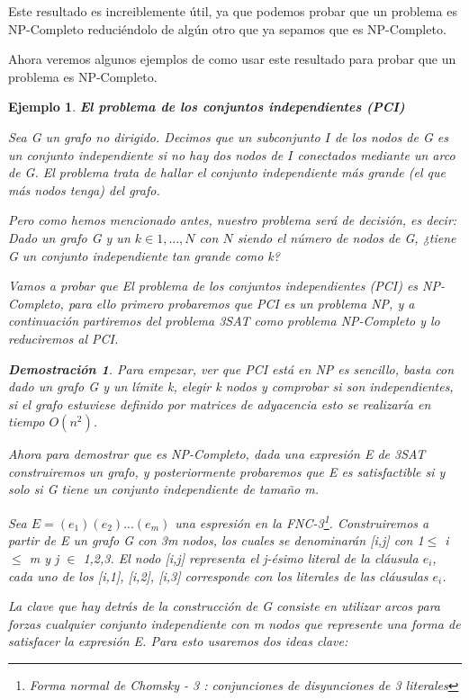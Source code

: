 \documentclass[a4paper,12pt,titlepage]{article}
\newtheorem{eje}{Ejemplo}[section]
\newtheorem*{dem}{\textbf{Demostraci\'on}}
\begin{document}
Este resultado es increiblemente \'util, ya que podemos probar que un problema es NP-Completo reduci\'endolo de alg\'un otro que ya sepamos que es NP-Completo.

Ahora veremos algunos ejemplos de como usar este resultado para probar que un problema es NP-Completo.

\begin{eje}

\textbf{El problema de los conjuntos independientes (PCI)}
\vspace{\baselineskip}

Sea G un grafo no dirigido. Decimos que un subconjunto $I$ de los nodos de G es un conjunto independiente si no hay dos nodos de $I$ conectados mediante un arco de G. El problema trata de hallar el conjunto independiente m\'as grande (el que m\'as nodos tenga) del grafo.

Pero como hemos mencionado antes, nuestro problema ser\'a de decisi\'on, es decir: Dado un grafo G y un $k \in {1,...,N}$ con $N$ siendo el n\'umero de nodos de G, ¿tiene G un conjunto independiente tan grande como k?

Vamos a probar que El problema de los conjuntos independientes (PCI) es NP-Completo, para ello primero probaremos que PCI \cite{HopcroftESP} es un problema NP, y a continuaci\'on partiremos del problema 3SAT como problema NP-Completo y lo reduciremos al PCI.

\begin{dem}

Para empezar, ver que PCI est\'a en NP es sencillo, basta con dado un grafo G y un l\'imite k, elegir k nodos y comprobar si son independientes, si el grafo estuviese definido por matrices de adyacencia esto se realizar\'ia en tiempo $O(n^{2})$.

Ahora para demostrar que es NP-Completo, dada una expresi\'on E de 3SAT construiremos un grafo, y posteriormente probaremos que E es satisfactible si y solo si G tiene un conjunto independiente de tamaño m.

Sea $E = (e_1)(e_2)...(e_m)$ una espresi\'on en la FNC-3\footnote{Forma normal de Chomsky - 3 : conjunciones de disyunciones de 3 literales}. Construiremos a partir de E un grafo G con 3m nodos, los cuales se denominar\'an [i,j] con 1$\leq$ i $\leq $ m y j $\in$ {1,2,3}. El nodo [i,j] representa el j-\'esimo literal de la cl\'ausula $e_i$, cada uno de los [i,1], [i,2], [i,3] corresponde con los literales de las cl\'ausulas $e_i$.

La clave que hay detr\'as de la construcci\'on de G consiste en utilizar arcos para forzas cualquier conjunto independiente con m nodos que represente una forma de satisfacer la expresi\'on E. Para esto usaremos dos ideas clave:


\end{dem}
\end{eje}
\end{document}
